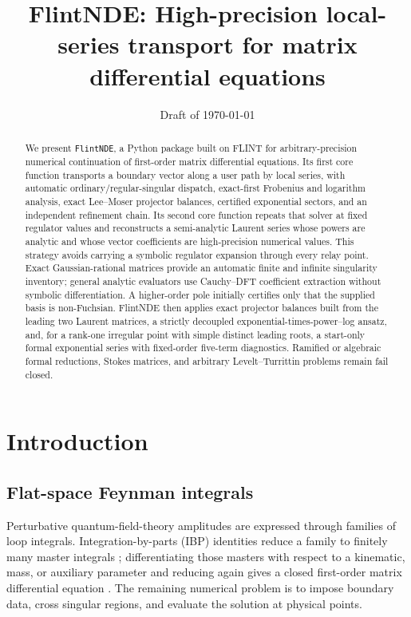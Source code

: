 \documentclass[11pt]{article}
\title{FlintNDE: High-precision local-series transport for matrix differential equations}
\date{Draft of \today}
\renewcommand{\_}{\origunderscore\allowbreak}
\begin{document}
\maketitle

\begin{abstract}
We present \texttt{FlintNDE}, a Python package built on FLINT for arbitrary-precision
numerical continuation of first-order matrix differential equations.  Its first core
function transports a boundary vector along a user path by local series, with automatic
ordinary/regular-singular dispatch, exact-first Frobenius and logarithm analysis, exact
Lee--Moser projector balances, certified exponential sectors, and an independent refinement chain.  Its
second core function repeats that solver at fixed
regulator values and reconstructs a semi-analytic Laurent series whose powers are analytic
and whose vector coefficients are high-precision numerical values.  This strategy avoids
carrying a symbolic regulator expansion through every relay point.  Exact
Gaussian-rational matrices provide an automatic finite and infinite singularity inventory;
general analytic evaluators use Cauchy--DFT coefficient extraction without symbolic
differentiation.  A higher-order pole initially certifies only that the supplied basis is
non-Fuchsian.  FlintNDE then applies exact projector balances built from the leading two
Laurent matrices, a strictly decoupled exponential-times-power--log ansatz, and, for a
rank-one irregular point with simple distinct leading roots, a start-only formal exponential
series with fixed-order five-term diagnostics.  Ramified or algebraic formal reductions,
Stokes matrices, and arbitrary Levelt--Turrittin problems remain fail closed.
\end{abstract}

\section{Introduction}

\subsection{Flat-space Feynman integrals}

Perturbative quantum-field-theory amplitudes are expressed through families of loop
integrals.  Integration-by-parts (IBP) identities reduce a family to finitely many master
integrals \cite{Chetyrkin:1981qh}; differentiating those masters with respect to a
kinematic, mass, or auxiliary parameter and reducing again gives a closed first-order
matrix differential equation \cite{Gehrmann:1999as}.  The remaining numerical problem is
to impose boundary data, cross singular regions, and evaluate the solution at physical
points.
\end{document}
